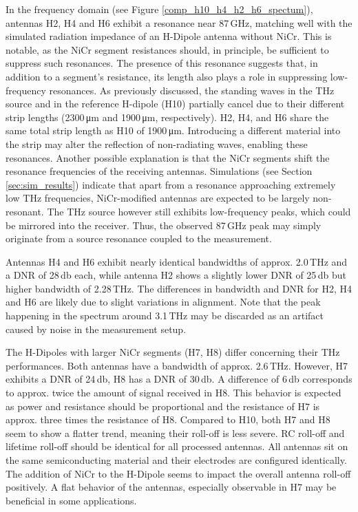 In the frequency domain (see Figure \ref{comp_h10_h4_h2_h6_spectum}), antennas H2, H4 and H6 exhibit a resonance near \num{87}\,\si{\giga\hertz}, matching well with the simulated radiation impedance of an H-Dipole antenna without NiCr. This is notable, as the NiCr segment resistances should, in principle, be sufficient to suppress such resonances. The presence of this resonance suggests that, in addition to a segment’s resistance, its length also plays a role in suppressing low-frequency resonances. As previously discussed, the standing waves in the THz source and in the reference H-dipole (H10) partially cancel due to their different strip lengths (\num{2300}\,\si{\micro\meter} and \num{1900}\,\si{\micro\meter}, respectively). H2, H4, and H6 share the same total strip length as H10 of \num{1900}\,\si{\micro\meter}. Introducing a different material into the strip may alter the reflection of non-radiating waves, enabling these resonances. Another possible explanation is that the NiCr segments shift the resonance frequencies of the receiving antennas. Simulations (see Section \ref{sec:sim_results}) indicate that apart from a resonance approaching extremely low THz frequencies, NiCr-modified antennas are expected to be largely non-resonant. The THz source however still exhibits low-frequency peaks, which could be mirrored into the receiver. Thus, the observed \num{87}\,\si{\giga\hertz} peak may simply originate from a source resonance coupled to the measurement. 

Antennas H4 and H6 exhibit nearly identical bandwidths of approx. \num{2.0}\,\si{\tera \hertz} and a DNR of \num{28}\,\si{\decibel} each, while antenna H2 shows a slightly lower DNR of \num{25}\,\si{\decibel} but higher bandwidth of \num{2.28}\,\si{\tera\hertz}. The differences in bandwidth and DNR for H2, H4 and H6 are likely due to slight variations in alignment. Note that the peak happening in the spectrum around \num{3.1}\,\si{\tera \hertz} may be discarded as an artifact caused by noise in the measurement setup.

The H-Dipoles with larger NiCr segments (H7, H8) differ concerning their THz performances. Both antennas have a bandwidth of approx. \num{2.6}\,\si{\tera \hertz}. However, H7 exhibits a DNR of \num{24}\,\si{\decibel}, H8 has a DNR of \num{30}\,\si{\decibel}. A difference of \num{6}\,\si{\decibel} corresponds to approx. twice the amount of signal received in H8. This behavior is expected as power and resistance should be proportional and the resistance of H7 is approx. three times the resistance of H8. Compared to H10, both H7 and H8 seem to show a flatter trend, meaning their roll-off is less severe. RC roll-off and lifetime roll-off should be identical for all processed antennas. All antennas sit on the same semiconducting material and their electrodes are configured identically. The addition of NiCr to the H-Dipole seems to impact the overall antenna roll-off positively. A flat behavior of the antennas, especially observable in H7 may be beneficial in some applications. 

